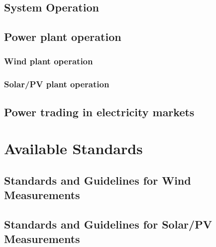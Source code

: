 \subsection{System Operation}

\subsection{Power plant operation}

\subsubsection{Wind plant operation}

\subsubsection{Solar/PV plant operation}

\subsection{Power trading in electricity markets {\color{magenta}{Contributing author: ES}}}

\section{Available {\color{blue}{(Applicable ?)}} Standards {\color{magenta}{Contributing author: COM}}}

\subsection{Standards and Guidelines for Wind Measurements}

\subsection{Standards and Guidelines for Solar/PV Measurements}
